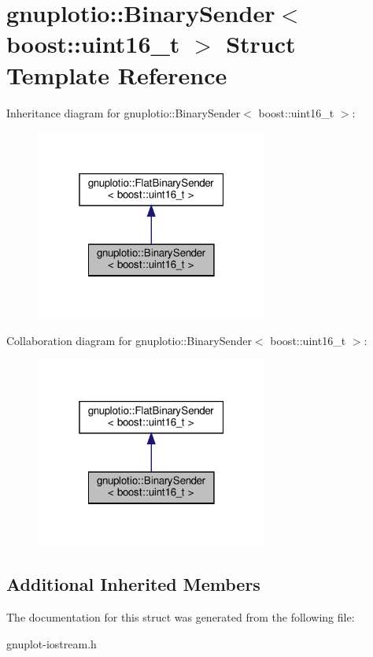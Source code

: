 \hypertarget{structgnuplotio_1_1BinarySender_3_01boost_1_1uint16__t_01_4}{}\section{gnuplotio\+:\+:Binary\+Sender$<$ boost\+:\+:uint16\+\_\+t $>$ Struct Template Reference}
\label{structgnuplotio_1_1BinarySender_3_01boost_1_1uint16__t_01_4}


Inheritance diagram for gnuplotio\+:\+:Binary\+Sender$<$ boost\+:\+:uint16\+\_\+t $>$\+:
\nopagebreak
\begin{figure}[H]
\begin{center}
\leavevmode
\includegraphics[width=217pt]{structgnuplotio_1_1BinarySender_3_01boost_1_1uint16__t_01_4__inherit__graph}
\end{center}
\end{figure}


Collaboration diagram for gnuplotio\+:\+:Binary\+Sender$<$ boost\+:\+:uint16\+\_\+t $>$\+:
\nopagebreak
\begin{figure}[H]
\begin{center}
\leavevmode
\includegraphics[width=217pt]{structgnuplotio_1_1BinarySender_3_01boost_1_1uint16__t_01_4__coll__graph}
\end{center}
\end{figure}
\subsection*{Additional Inherited Members}


The documentation for this struct was generated from the following file\+:\begin{DoxyCompactItemize}
\item 
gnuplot-\/iostream.\+h\end{DoxyCompactItemize}
